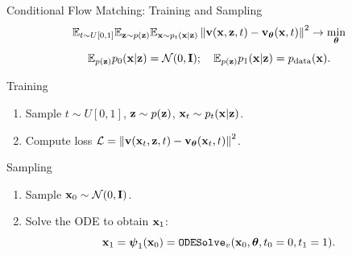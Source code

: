 \documentclass{beamer}
\begin{document}
\begin{frame}{Conditional Flow Matching: Training and Sampling}
	\[
		\mathbb{E}_{t \sim U[0, 1]} \mathbb{E}_{\mathbf{z} \sim p(\mathbf{z})} \mathbb{E}_{\mathbf{x} \sim p_t(\mathbf{x} | \mathbf{z})}\left\| \mathbf{v}(\mathbf{x}, \mathbf{z}, t) - \mathbf{v}_{\boldsymbol{\theta}}(\mathbf{x}, t) \right\|^2 \rightarrow \min_{\boldsymbol{\theta}}
	\]
	\[
		\mathbb{E}_{p(\mathbf{z})} p_0(\mathbf{x} | \mathbf{z}) = \mathcal{N}(0, \mathbf{I}); \quad \mathbb{E}_{p(\mathbf{z})} p_1(\mathbf{x} | \mathbf{z}) = p_{\text{data}}(\mathbf{x}).
	\]
	\eqpause
	\vspace{-0.3cm}
	\begin{block}{Training}
		\begin{enumerate}
			\item Sample $t \sim U[0, 1]$, $\mathbf{z} \sim p(\mathbf{z})$, $\mathbf{x}_t \sim p_t(\mathbf{x} | \mathbf{z})$.
			\item Compute loss $ \mathcal{L} = \left\| \mathbf{v}(\mathbf{x}_t, \mathbf{z}, t) - \mathbf{v}_{\boldsymbol{\theta}}(\mathbf{x}_t, t) \right\|^2 $.
		\end{enumerate}
	\end{block}
	\eqpause
	\begin{block}{Sampling}
		\begin{enumerate}
			\item Sample $\mathbf{x}_0 \sim \mathcal{N}(0, \mathbf{I})$.
			\item Solve the ODE to obtain $\mathbf{x}_1$:
			\vspace{-0.3cm}
			\[
				\mathbf{x}_1 = \boldsymbol{\psi}_1(\mathbf{x}_0) = \texttt{ODESolve}_v(\mathbf{x}_0, \boldsymbol{\theta}, t_0=0, t_1=1).
			\]
		\end{enumerate}
	\end{block}
\end{frame}
\end{document}
